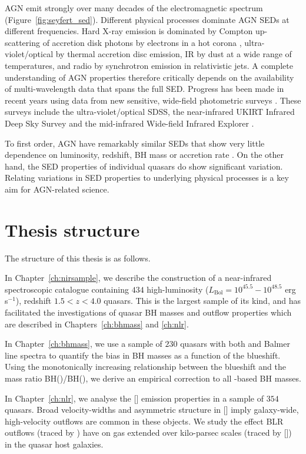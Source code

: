 AGN emit strongly over many decades of the electromagnetic spectrum (Figure~\ref{fig:seyfert_sed}).
Different physical processes dominate AGN SEDs at different frequencies.
Hard X-ray emission is dominated by Compton up-scattering of accretion disk photons by electrons in a hot corona \citep[e.g.][]{sunyaev80}, ultra-violet/optical by thermal accretion disc emission, IR by dust at a wide range of temperatures, and radio by synchrotron emission in relativistic jets.
A complete understanding of AGN properties therefore critically depends on the availability of multi-wavelength data that spans the full SED.
Progress has been made in recent years using data from new sensitive, wide-field photometric surveys \citep[e.g.][]{roseboom13}.
These surveys include the ultra-violet/optical SDSS, the near-infrared UKIRT Infrared Deep Sky Survey \citep[UKIDSS;][]{lawrence07} and the mid-infrared Wide-field Infrared Explorer \citep[WISE;][]{wright10}.

To first order, AGN have remarkably similar SEDs that show very little dependence on luminosity, redshift, BH mass or accretion rate \citep[e.g.][]{elvis12,hao13}.
On the other hand, the SED properties of individual quasars do show significant variation.
Relating variations in SED properties to underlying physical processes is a key aim for AGN-related science.

\section{Thesis structure}

The structure of this thesis is as follows.

In Chapter~\ref{ch:nirsample}, we describe the construction of a near-infrared spectroscopic catalogue containing $434$ high-luminosity ($L_{\text{Bol}} = 10^{45.5}-10^{48.5}$ erg s$^{-1}$), redshift $1.5 < z < 4.0$ quasars.
This is the largest sample of its kind, and has facilitated the investigations of quasar BH masses and outflow properties which are described in Chapters~\ref{ch:bhmass} and \ref{ch:nlr}.

In Chapter~\ref{ch:bhmass}, we use a sample of $230$ quasars with both  and Balmer line spectra to quantify the bias in  BH masses as a function of the  blueshift.
Using the monotonically increasing relationship between the  blueshift and the mass ratio BH()/BH(\hans), we derive an empirical correction to all -based BH masses.

In Chapter~\ref{ch:nlr}, we analyse the [] emission properties in a sample of $354$ quasars.
Broad velocity-widths and asymmetric structure in [] imply galaxy-wide, high-velocity outflows are common in these objects.
We study the effect BLR outflows (traced by ) have on gas extended over kilo-parsec scales (traced by []) in the quasar host galaxies.

